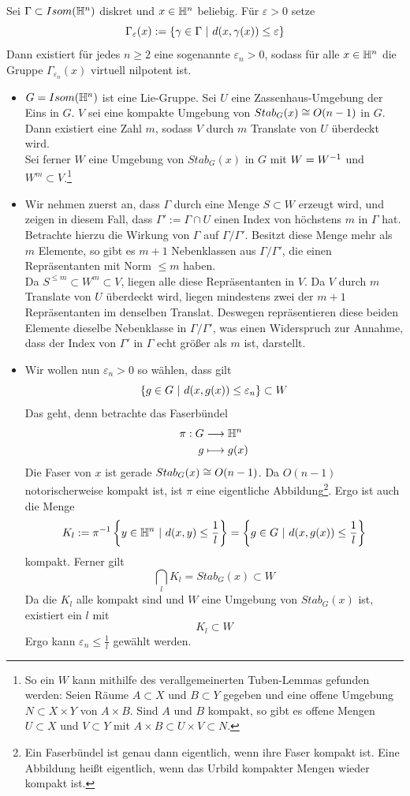 \documentclass{book}
\renewcommand{\epsilon}{\varepsilon}
\begin{document}
Sei $\Gamma \subset Isom(\mathbb{H}^n)$ diskret und $x \in \mathbb{H}^n$ beliebig. Für $\epsilon > 0$ setze
\[ \Gamma_\epsilon(x) := \set{\gamma \in \Gamma}{d(x, \gamma(x)) \leq \epsilon} \]
Dann existiert für jedes $n\geq 2$ eine sogenannte  $\epsilon_n > 0$, sodass für alle $x \in \mathbb{H}^n$ die Gruppe $\Gamma_{\epsilon_n}(x)$ virtuell nilpotent ist.
\begin{Beweis}{}
	\begin{itemize}
		\item $G = Isom(\mathbb{H}^n)$ ist eine Lie-Gruppe.
		Sei $U$ eine Zassenhaus-Umgebung der Eins in $G$. $V$ sei eine kompakte Umgebung von $Stab_G(x) \overset{}{\cong} O(n-1)$ in $G$. Dann existiert eine Zahl $m$, sodass $V$ durch $m$ Translate von $U$ überdeckt wird.\\
		Sei ferner $W$ eine Umgebung von $Stab_G(x)$ in $G$ mit $W = W^{-1}$ und $W^m \subset V$.\footnote{
			So ein $W$ kann mithilfe des verallgemeinerten Tuben-Lemmas gefunden werden: Seien Räume $A\subset X$ und $B \subset Y$ gegeben und eine offene Umgebung $N \subset X \times Y$ von $A\times B$. Sind $A$ und $B$ kompakt, so gibt es offene Mengen $U \subset X$ und $V \subset Y$ mit $A\times B \subset U \times V\subset N$.
		}
	\item Wir nehmen zuerst an, dass $\Gamma$ durch eine Menge $S \subset W$ erzeugt wird, und zeigen in diesem Fall, dass $\Gamma' := \Gamma \cap U$ einen Index von höchstens $m$ in $\Gamma$ hat.\\
	Betrachte hierzu die Wirkung von $\Gamma$ auf $\Gamma / \Gamma'$. Besitzt diese Menge mehr als $m$ Elemente, so gibt es $m+1$ Nebenklassen aus $\Gamma / \Gamma'$, die einen Repräsentanten mit Norm $\leq m$ haben.\\
	Da $S^{\leq m} \subset W^m \subset V$, liegen alle diese Repräsentanten in $V$. Da $V$ durch $m$ Translate von $U$ überdeckt wird, liegen mindestens zwei der $m+1$ Repräsentanten im denselben Translat. Deswegen repräsentieren diese beiden Elemente dieselbe Nebenklasse in $\Gamma / \Gamma'$, was einen Widerspruch zur Annahme, dass der Index von $\Gamma'$ in $\Gamma$ echt größer als $m$ ist, darstellt.
	\item Wir wollen nun $\epsilon_n > 0$ so wählen, dass gilt
	\[ \set{g \in G}{d(x, g(x)) \leq \epsilon_n} \subset W \]
Das geht, denn betrachte das Faserbündel
	\begin{align*}
	\pi : G & \overset{}{\longrightarrow} \mathbb{H}^n\\
	g & \longmapsto g(x)
	\end{align*}
	Die Faser von $x$ ist gerade $Stab_G(x) \overset{}{\cong} O(n-1)$. Da $O(n-1)$ notorischerweise kompakt ist, ist $\pi$ eine eigentliche Abbildung\footnote{
Ein Faserbündel ist genau dann eigentlich, wenn ihre Faser kompakt ist. Eine Abbildung heißt eigentlich, wenn das Urbild kompakter Mengen wieder kompakt ist.	
}. Ergo ist auch die Menge
\[ K_l := \pi\i\set{y \in \H^n}{ d(x,y) \leq \frac{1}{l} } = \set{g \in G}{d(x, g(x)) \leq \frac{1}{l}} \]
kompakt. Ferner gilt
\[ \bigcap_l K_l = Stab_G(x) \subset W \]
Da die $K_l$ alle kompakt sind und $W$ eine Umgebung von $Stab_G(x)$ ist, existiert ein $l$ mit
\[ K_l \subset W \]
Ergo kann $\epsilon_n \leq \frac{1}{l}$ gewählt werden.
	\end{itemize}
	

\end{Beweis}
\end{document}
